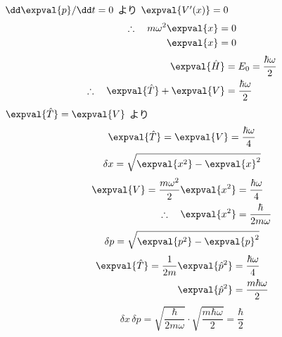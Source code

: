 $\dd\expval{p}/\dd t=0$ より $\expval{V'(x)}=0$
\begin{align*}
\therefore\quad m\omega^{2}\expval{x}&=0\\
\expval{x}&=0
\end{align*}
\begin{align*}
\expval{\hat{H}}&=E_{0}=\frac{\hbar\omega}{2}\\
\therefore\quad\expval{\hat{T}}+\expval{V}&=\frac{\hbar\omega}{2}
\end{align*}
$\expval{\hat{T}}=\expval{V}$ より
\[ \expval{\hat{T}}=\expval{V}=\frac{\hbar\omega}{4} \]
\[ \delta x=\sqrt{\expval{x^{2}}-\expval{x}^{2}} \]
\begin{align*}
\expval{V}=\frac{m\omega^{2}}{2}\expval{x^{2}}&=\frac{\hbar\omega}{4}\\
\therefore\quad\expval{x^{2}}&=\frac{\hbar}{2m\omega}
\end{align*}
\[ \delta p=\sqrt{\expval{p^{2}}-\expval{p}^{2}} \]
\begin{align*}
\expval{\hat{T}}=\frac{1}{2m}\expval{\hat{p}^{2}}&=\frac{\hbar\omega}{4}\\
\expval{\hat{p}^{2}}&=\frac{m\hbar\omega}{2}
\end{align*}
\[ \delta x\,\delta p=\sqrt{\frac{\hbar}{2m\omega}}\cdot\sqrt{\frac{m\hbar\omega}{2}}=\frac{\hbar}{2} \]
